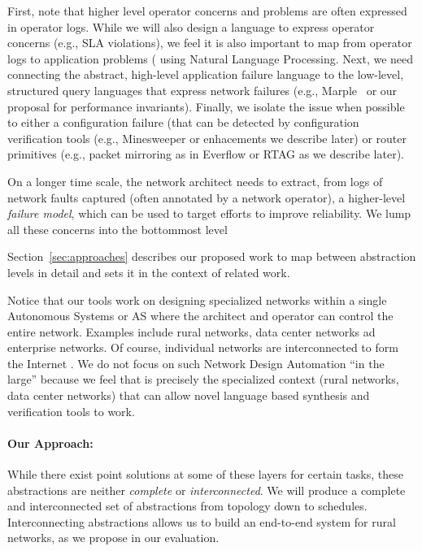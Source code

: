 First, note that higher level operator concerns and problems are often expressed in operator logs.  While
we will also design a language to express operator concerns (e.g., SLA violations), we feel it is also
important to map from operator logs to application problems ( using Natural Language Processing.
Next, we need connecting the abstract, high-level application failure language to the
low-level, structured query languages that express network failures (e.g., Marple~\cite{marple} or 
our proposal for  performance invariants).  Finally, we isolate the issue when possible to 
either a configuration failure (that can be detected by configuration verification tools (e.g., Minesweeper\cite{minesweeper} or enhacements we describe later) or router primitives (e.g., packet mirroring as in
Everflow or RTAG as we describe later).

 On a longer time scale, the
network architect needs to extract, from logs of network faults
captured (often annotated by a network operator), a higher-level
{\em failure model}, which can be used to target efforts to improve
reliability. We lump all these concerns into the bottommost level


Section~\ref{sec:approaches} describes our proposed work to map between abstraction levels
in detail and sets it in the context of related work.



Notice that our tools work on designing specialized networks within a single
Autonomous Systems or AS where the architect and operator can control the 
entire network.  Examples include rural networks, data center networks ad 
enterprise networks. Of course, individual networks are interconnected to form the Internet .  We do not focus on such Network Design Automation ``in the large''
because we feel that is precisely the specialized context (rural networks, 
data center networks) that can allow novel language based synthesis and
verification tools to work.

\paragraph*{Our Approach:} While there exist point solutions at some of
these layers for certain tasks, these abstractions are neither {\em
  complete} or {\em interconnected}. We will produce a complete and
interconnected set of abstractions from topology down to schedules.
Interconnecting abstractions allows us to build
an end-to-end system for rural networks, as we propose
in our evaluation.



 
